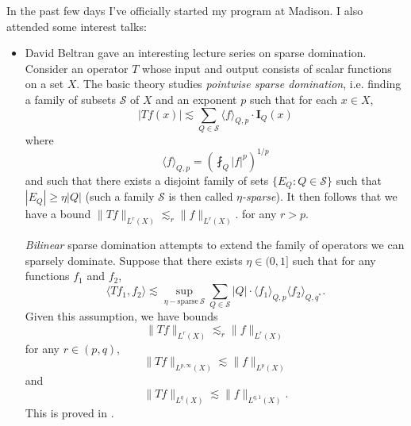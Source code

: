 \documentclass[openany,nobib,nols,a4paper,twoside,symmetric,justified,notoc]{tufte-book}
\theoremstyle{plain}
\theoremstyle{remark}
\theoremstyle{definition}
\begin{document}
In the past few days I've officially started my program at Madison. I also attended some interest talks:
%
\begin{itemize}
    \item David Beltran gave an interesting lecture series on sparse domination. Consider an operator $T$ whose input and output consists of scalar functions on a set $X$. The basic theory studies \emph{pointwise sparse domination}, i.e. finding a family of subsets $\mathcal{S}$ of $X$ and an exponent $p$ such that for each $x \in X$,
    \[ |Tf(x)| \lesssim \sum_{Q \in \mathcal{S}} \langle f \rangle_{Q,p} \cdot \mathbf{I}_Q(x) \]
    where
    \[ \langle f \rangle_{Q,p} = \left( \fint_Q |f|^p \right)^{1/p} \]
    and such that there exists a disjoint family of sets $\{ E_Q : Q \in \mathcal{S} \}$ such that $|E_Q| \geq \eta |Q|$ (such a family $\mathcal{S}$ is then called \emph{$\eta$-sparse}). It then follows that we have a bound $\| Tf \|_{L^r(X)} \lesssim_r \| f \|_{L^r(X)}$. for any $r > p$.

    \emph{Bilinear} sparse domination attempts to extend the family of operators we can sparsely dominate. Suppose that there exists $\eta \in (0,1]$ such that for any functions $f_1$ and $f_2$,
    \[ \langle Tf_1, f_2 \rangle \lesssim \sup_{\eta-\text{sparse}\ \mathcal{S}} \sum_{Q \in \mathcal{S}} |Q| \cdot \langle f_1 \rangle_{Q,p} \langle f_2 \rangle_{Q,q^*}. \]
    Given this assumption, we have bounds
    \[ \| Tf \|_{L^r(X)} \lesssim_r \| f \|_{L^r(X)} \]
    for any $r \in (p,q)$,
    \[ \| Tf \|_{L^{p,\infty}(X)} \lesssim \| f \|_{L^p(X)} \]
    and
    \[ \| Tf \|_{L^q(X)} \lesssim \| f \|_{L^{q,1}(X)}. \]
    This is proved in \cite{Bernicot2016}.


\end{itemize}
\end{document}
